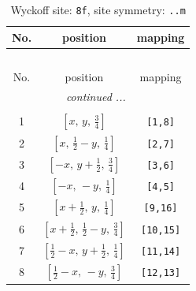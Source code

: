 \documentclass[fleqn,8pt]{jsarticle}
\begin{document}
\begin{longtable}{ccc}
\caption{Wyckoff site: {\tt 8f}, site symmetry: {\tt ..m}}
 \\
 \hline \hline
No. & position & mapping \\ \hline \endfirsthead

\multicolumn{2}{l}{\tablename\ \thetable{}} \\
 \hline \hline
No. & position & mapping \\ \hline \endhead

 \hline \hline
\multicolumn{2}{r}{\footnotesize\it continued ...} \\ \endfoot

 \hline \hline
\multicolumn{2}{r}{} \\ \endlastfoot

1 & $\left[ x,\, y,\, \frac{3}{4} \right]$ & {\tt [1,8]} \\ \hline
2 & $\left[ x,\, \frac{1}{2} - y,\, \frac{1}{4} \right]$ & {\tt [2,7]} \\ \hline
3 & $\left[ - x,\, y + \frac{1}{2},\, \frac{3}{4} \right]$ & {\tt [3,6]} \\ \hline
4 & $\left[ - x,\, - y,\, \frac{1}{4} \right]$ & {\tt [4,5]} \\ \hline
5 & $\left[ x + \frac{1}{2},\, y,\, \frac{1}{4} \right]$ & {\tt [9,16]} \\ \hline
6 & $\left[ x + \frac{1}{2},\, \frac{1}{2} - y,\, \frac{3}{4} \right]$ & {\tt [10,15]} \\ \hline
7 & $\left[ \frac{1}{2} - x,\, y + \frac{1}{2},\, \frac{1}{4} \right]$ & {\tt [11,14]} \\ \hline
8 & $\left[ \frac{1}{2} - x,\, - y,\, \frac{3}{4} \right]$ & {\tt [12,13]} \\
\end{longtable}
\renewcommand{\arraystretch}{1.2}
\end{document}
